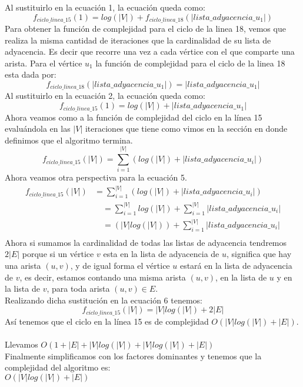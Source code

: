 \documentclass[12pt]{article}
\begin{document}
Al sustituirlo en la ecuación 1, la ecuación queda como:\\
\begin{equation}
f_{ciclo\_linea\_15}(1)= log(|V|) + f_{ciclo\_linea\_18}(|lista\_adyacencia\_u_1|)
\end{equation}
Para obtener la función de complejidad para el ciclo de la linea 18, vemos que realiza la misma cantidad de iteraciones que la cardinalidad de su lista de adyacencia. Es decir que recorre una vez a cada vértice con el que comparte una arista.
Para el vértice $u_1$ la función de complejidad para el ciclo de la linea 18 esta dada por:
\begin{equation}
f_{ciclo\_linea\_18}(|lista\_adyacencia\_u_1|)= |lista\_adyacencia\_u_1|
\end{equation}
Al sustituirlo en la ecuación 2, la ecuación queda como:\\
\begin{equation}
f_{ciclo\_linea\_15}(1)= log(|V|) + |lista\_adyacencia\_u_1|
\end{equation}
Ahora veamos como a la función de complejidad del ciclo en la línea 15 evaluándola en las $|V|$ iteraciones que tiene como vimos en la sección en donde definimos que el algoritmo termina.
\begin{equation}
f_{ciclo\_linea\_15}(|V|)= \sum_{i=1}^{|V|}{(log(|V|) + |lista\_adyacencia\_u_i|)}
\end{equation}
Ahora veamos otra perspectiva para la ecuación 5.
\begin{equation}
\begin{split}
f_{ciclo\_linea\_15}(|V|) & =\sum_{i=1}^{|V|}{(log(|V|) + |lista\_adyacencia\_u_i|)} \\
&\quad =\sum_{i=1}^{|V|}{log(|V|)} + \sum_{i=1}^{|V|}{|lista\_adyacencia\_u_i|}\\  
&\quad = (|V|log(|V|)) + \sum_{i=1}^{|V|}{|lista\_adyacencia\_u_i|}\\  
\end{split}
\end{equation}
Ahora si sumamos la cardinalidad de todas las listas de adyacencia tendremos $2|E|$ porque si un vértice $v$ esta en la lista de adyacencia de $u$, significa que hay una arista $(u,v)$, y de igual forma el vértice $u$ estará en la lista de adyacencia de $v$, es decir, estamos contando una misma arista $(u, v)$, en la lista de $u$ y en la lista de $v$, para toda arista $(u, v) \in E$.\\
Realizando dicha sustitución en la ecuación 6 tenemos:\\
\begin{equation}
f_{ciclo\_linea\_15}(|V|)= |V|log(|V|) + 2|E|
\end{equation}
Así tenemos que el ciclo en la línea 15 es de complejidad $O(|V|log(|V|) + |E|)$.\\\\
Llevamos $O(1 + |E| + |V|log(|V|) + |V|log(|V|) + |E|)$\\
Finalmente simplificamos con los factores dominantes y tenemos que la complejidad del algoritmo es:\\
$O(|V|log(|V|) + |E|)$
\end{document}
